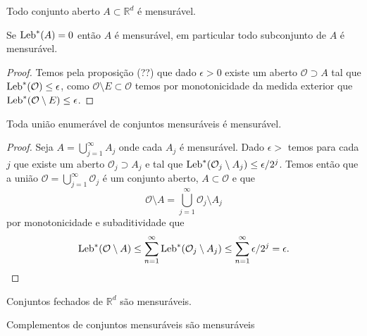 \begin{proposicao}
Todo conjunto aberto $A\subset \mathbb{R}^d$ é mensurável.
\end{proposicao}






\begin{proposicao}
Se $\textnormal{Leb}^{*}(A)=0$ então $A$ é  mensurável, em particular 
todo subconjunto de $A$ é mensurável.
\end{proposicao}
\begin{proof}
Temos pela proposição (??) que dado $\epsilon>0$ existe 
um aberto $\mathcal{O}\supset A$ tal que 
$\textnormal{Leb}^{*}(\mathcal{O})\leq \epsilon$, 
como $\mathcal{O}\setminus E\subset \mathcal{O}$ 
temos por monotonicidade da medida exterior 
que $\textnormal{Leb}^{*}(\mathcal{O}\setminus E)\leq \epsilon$. 
\end{proof}





\begin{proposicao}
Toda  união enumerável de conjuntos mensuráveis é mensurável.
\end{proposicao}

\begin{proof}
Seja $A=\bigcup_{j=1}^{\infty} A_j$ onde cada $A_j$ é mensurável. 
Dado $\epsilon>$ temos para cada $j$ que existe um 
aberto $\mathcal{O}_j\supset A_j$ e 
tal que $\textnormal{Leb}^{*}(\mathcal{O}_j\setminus A_j)\leq \epsilon/2^j$. 
Temos então que  a união 
$\mathcal{O}=\bigcup_{j=1}^{\infty}\mathcal{O}_j$ 
é um conjunto aberto,   $A\subset \mathcal{O}$ e
que 
$$
\mathcal{O}\setminus A=\bigcup_{j=1}^{\infty} \mathcal{O}_j\setminus A_j
$$
por monotonicidade e subaditividade que 
$$
\textnormal{Leb}^{*}(\mathcal{O}\setminus A)
\leq 
\sum_{n=1}^\infty \textnormal{Leb}^{*}(\mathcal{O}_j\setminus A_j)
\leq 
\sum_{n=1}^\infty \epsilon/2^j=\epsilon.
$$

\end{proof}


\begin{proposicao}
Conjuntos fechados de $\mathbb{R}^d$ são mensuráveis.
\end{proposicao}





\begin{proposicao}
Complementos de conjuntos mensuráveis são mensuráveis
\end{proposicao}


\begin{proposicao}

\end{proposicao}
  

